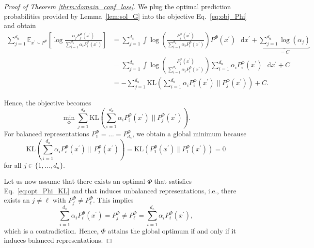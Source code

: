 \documentclass{article}
\theoremstyle{plain}
\theoremstyle{definition}
\theoremstyle{remark}
\newcommand{\dd}{\mathop{}\!\mathrm{d}}
\begin{document}
\begin{proof}[Proof of Theorem \ref{thrm:domain_conf_loss}]
We plug the optimal prediction probabilities provided by Lemma~\ref{lem:sol_G} into the objective Eq.~\eqref{eq:obj_Phi} and obtain
\begin{align}
    \sum_{j=1}^{d_a} \mathbb{E}_{x^\prime \sim P^\Phi}\left[ \log\frac{\alpha_j P^\Phi_j(x^\prime)}{\sum_{i=1}^{d_a}\alpha_i P^\Phi_i(x^\prime)} \right] &=  \sum_{j=1}^{d_a} \int \log\left(\frac{ P^\Phi_j(x^\prime)}{\sum_{i=1}^{d_a}\alpha_i P^\Phi_i(x^\prime)} \right)  P^\Phi(x^\prime) \, \dd x^\prime + \underbrace{\sum_{j=1}^{d_a} \log(\alpha_j)}_{=C} \\
    &= \sum_{j=1}^{d_a} \int \log\left(\frac{ P^\Phi_j(x^\prime)}{\sum_{i=1}^{d_a}\alpha_i P^\Phi_i(x^\prime)} \right)  \sum_{i=1}^{d_a}\alpha_i P^\Phi_i(x^\prime) \, \dd x^\prime + C \\
    &= - \sum_{j=1}^{d_a} \mathrm{KL}\left(\sum_{i=1}^{d_a}\alpha_i P^\Phi_i(x^\prime) \; \Bigg\vert\Bigg\vert\; P^\Phi_j(x^\prime)\right) + C.
\end{align}

Hence, the objective becomes
\begin{equation}
 \min_{\Phi}   \sum_{j=1}^{d_a} \mathrm{KL}\left(\sum_{i=1}^{d_a}\alpha_i P^\Phi_i(x^\prime) \; \Bigg\vert\Bigg\vert\; P^\Phi_j(x^\prime)\right).
\end{equation}
For balanced representations $P^\Phi_1 = \dots = P^\Phi_{d_a}$, we obtain a global minimum because
\begin{equation}\label{eq:opt_Phi_KL}
    \mathrm{KL}\left(\sum_{i=1}^{d_a}\alpha_i P^\Phi_i(x^\prime) \; \Bigg\vert\Bigg\vert\;  P^\Phi_j(x^\prime)\right) = \mathrm{KL}\left(P^\Phi_1(x^\prime) \;\Big\vert\Big\vert\,  P^\Phi_1(x^\prime)\right) = 0
\end{equation}
for all $j \in \{1, \dots, d_a\}$.

Let us now assume that there exists an optimal $\Phi$ that satisfies Eq.~\eqref{eq:opt_Phi_KL} and that induces unbalanced representations, i.e., there exists an $j \neq \ell$ with $P^\Phi_j \neq P^\Phi_\ell$. This implies 
\begin{equation}
    \sum_{i=1}^{d_a}\alpha_i P^\Phi_i(x^\prime) = P^\Phi_j \neq P^\Phi_\ell = \sum_{i=1}^{d_a}\alpha_i P^\Phi_i(x^\prime) ,
\end{equation}
which is a contradiction. Hence, $\Phi$ attains the global optimum if and only if it induces balanced representations.
\end{proof}
\end{document}
